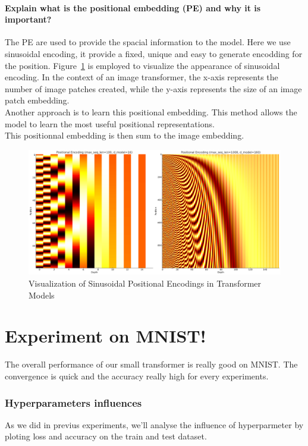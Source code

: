 \paragraph{Explain what is the positional embedding (PE) and why it is important?}
The PE are used to provide the spacial information to the model. Here we use sinusoidal encoding, it provide a fixed, unique and easy to generate encodding for the position. Figure~\ref{fig:pe_viz} is employed to visualize the appearance of sinusoidal encoding. In the context of an image transformer, the x-axis represents the number of image patches created, while the y-axis represents the size of an image patch embedding.  \\
Another approach is to learn this positional embedding. This method allows the model to learn the most useful positional representations. \\
This positionnal embedding is then sum to the image embedding.

\begin{figure}[H]
    \centering
    \includegraphics*[width=.75\textwidth]{figs/Transformers/positional_encoding_subplot.pdf}
    \caption{Visualization of Sinusoidal Positional Encodings in Transformer Models}
    \label{fig:pe_viz}
\end{figure}

\section{Experiment on MNIST!}
The overall performance of our small transformer is really good on MNIST. The convergence is quick and the accuracy really high for every experiments.

\subsubsection{Hyperparameters influences}
As we did in previus experiments, we'll analyse the influence of hyperparmeter by ploting loss and accuracy on the train and test dataset.

